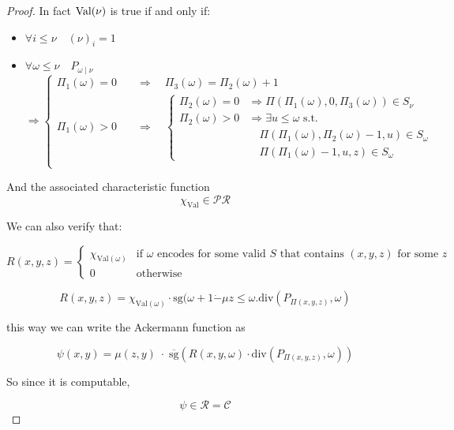 \begin{theorem}
\begin{proof}
    In fact $\text{Val}(\nu)$ is true if and only if:
    \begin{itemize}
    \item \(\forall i \leq \nu \quad (\nu)_i = 1\)
    \item{
        \( \forall \omega \leq \nu \quad P_{\omega \; | \; \nu}\) \\
        \[\Rightarrow \begin{cases}
            \Pi_1(\omega) = 0 \quad & \Rightarrow
            \quad \Pi_3(\omega) = \Pi_2(\omega) + 1 \\
            \Pi_1(\omega) > 0 \quad & \Rightarrow \quad
            \begin{cases}
              \Pi_2(\omega) = 0 & \Rightarrow
              \Pi(\Pi_1(\omega),0,\Pi_3(\omega)) \in S_\nu \\
              \Pi_2(\omega) > 0 & \Rightarrow
              \exists u \leq \omega \text{ s.t. } \\
              & \quad \Pi(\Pi_1(\omega), \Pi_2(\omega)-1,u) \in S_\omega \\
              & \quad \Pi(\Pi_1(\omega)-1, u,z) \in S_\omega
            \end{cases}
            \\
          \end{cases}
        \]
      }
    \end{itemize}

    And the associated characteristic function
    \[\chi_{\text{Val}} \in \mathcal{PR}\]

    We can also verify that:

    \[
      R(x,y,z) = \begin{cases}

        \chi_{\text{Val}(\omega)} & \text{if $\omega$ encodes for some
          valid $S$ that contains $(x,y,z)$ for some $z$} \\

        0 & \text{otherwise}

      \end{cases}
    \]

    \[
      R(x,y,z) = \chi_{\text{Val}(\omega)} \cdot \text{sg} (\omega + 1
      \dot{-} \mu z \leq \omega . \text{div}(P_{\Pi(x,y,z)}, \omega)
    \]

    this way we can write the Ackermann function as

    \[
      \psi(x,y) = \mu (z,y) \; \cdot \; \overline{\text{sg}}(R(x,y,\omega)
      \cdot \text{div}(P_{\Pi(x,y,z)}, \omega))
    \]

    So since it is computable,

    \[
      \psi \in \mathcal{R} = \mathcal{C}
    \]

  \end{proof}
\end{theorem}

